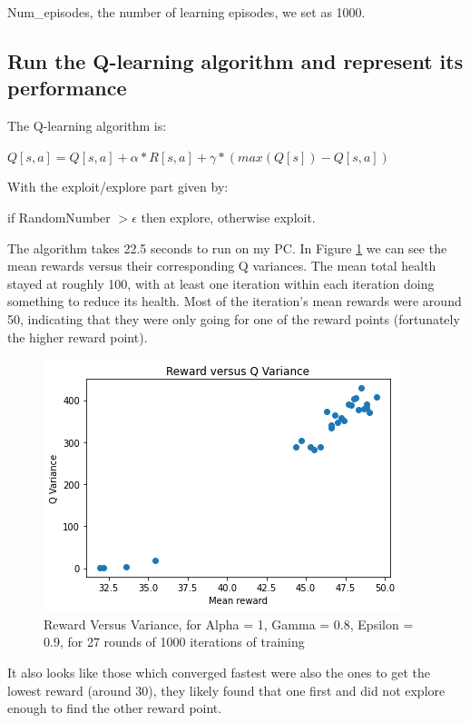 \documentclass[a4pape, 11pt, english]{article}
\begin{document}
Num\_episodes, the number of learning episodes, we set as 1000.

\subsection{Run the Q-learning algorithm and represent its performance}
The Q-learning algorithm is:

$Q[s, a] = Q[s, a] + \alpha * R[s, a] + \gamma * (max(Q[s]) - Q[s, a])$

With the exploit/explore part given by:

if RandomNumber $> \epsilon$ then explore, otherwise exploit.

The algorithm takes 22.5 seconds to run on my PC. In Figure \ref{fig:firstparamsRewardVQVar} we can see the mean rewards versus their corresponding Q variances. The mean total health stayed at roughly 100, with at least one iteration within each iteration doing something to reduce its health. Most of the iteration's mean rewards were around 50, indicating that they were only going for one of the reward points (fortunately the higher reward point).

\begin{figure}[h!]
	\begin{center}
		\includegraphics[scale=0.8]{img/firstparamsRewardVQVarWithEarlyStopping.png}
		\caption{Reward Versus Variance, for Alpha = 1, Gamma = 0.8, Epsilon = 0.9, for 27 rounds of 1000 iterations of training}
		\label{fig:firstparamsRewardVQVar}
	\end{center}
\end{figure}

It also looks like those which converged fastest were also the ones to get the lowest reward (around 30), they likely found that one first and did not explore enough to find the other reward point.
\end{document}
